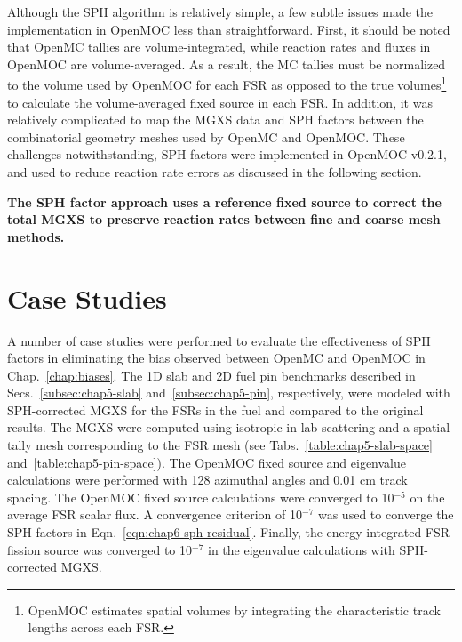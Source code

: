 Although the \ac{SPH} algorithm is relatively simple, a few subtle issues made the implementation in OpenMOC less than straightforward. First, it should be noted that OpenMC tallies are volume-integrated, while reaction rates and fluxes in OpenMOC are volume-averaged. As a result, the \ac{MC} tallies must be normalized to the volume used by OpenMOC for each \ac{FSR} as opposed to the true volumes\footnote{OpenMOC estimates spatial volumes by integrating the characteristic track lengths across each \ac{FSR}.} to calculate the volume-averaged fixed source in each \ac{FSR}. In addition, it was relatively complicated to map the \ac{MGXS} data and \ac{SPH} factors between the combinatorial geometry meshes used by OpenMC and OpenMOC. These challenges notwithstanding, \ac{SPH} factors were implemented in OpenMOC v0.2.1, and used to reduce reaction rate errors as discussed in the following section.

\begin{emphbox}
\textbf{The \ac{SPH} factor approach uses a reference fixed source to correct the total \ac{MGXS} to preserve reaction rates between fine and coarse mesh methods.}
\end{emphbox}

\section{Case Studies}
\label{sec:chap6-sph-case-studies}

A number of case studies were performed to evaluate the effectiveness of \ac{SPH} factors in eliminating the bias observed between OpenMC and OpenMOC in Chap.~\ref{chap:biases}. The 1D slab and 2D fuel pin benchmarks described in Secs.~\ref{subsec:chap5-slab} and~\ref{subsec:chap5-pin}, respectively, were modeled with \ac{SPH}-corrected \ac{MGXS} for the \ac{FSR}s in the fuel and compared to the original results. The \ac{MGXS} were computed using isotropic in lab scattering and a spatial tally mesh corresponding to the \ac{FSR} mesh (see Tabs.~\ref{table:chap5-slab-space} and~\ref{table:chap5-pin-space}). The OpenMOC fixed source and eigenvalue calculations were performed with 128 azimuthal angles and 0.01 cm track spacing. The OpenMOC fixed source calculations were converged to 10$^{-5}$ on the average \ac{FSR} scalar flux. A convergence criterion of 10$^{-7}$ was used to converge the \ac{SPH} factors in Eqn.~\ref{eqn:chap6-sph-residual}. Finally, the energy-integrated \ac{FSR} fission source was converged to 10$^{-7}$ in the eigenvalue calculations with \ac{SPH}-corrected \ac{MGXS}.


